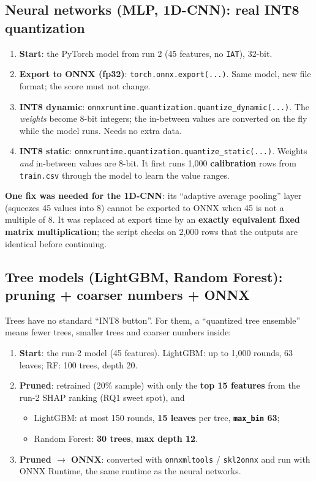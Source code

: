 \documentclass[11pt]{article}
\begin{document}
\subsection*{Neural networks (MLP, 1D-CNN): real INT8 quantization}
\begin{enumerate}
\item \textbf{Start}: the PyTorch model from run 2 (45 features, no \texttt{IAT}), 32-bit.
\item \textbf{Export to ONNX (fp32)}: \texttt{torch.onnx.export(...)}. Same model, new file format; the score must not change.
\item \textbf{INT8 dynamic}: \texttt{onnxruntime.quantization.quantize\_dynamic(...)}. The \emph{weights} become 8-bit integers; the in-between values
are converted on the fly while the model runs. Needs no extra data.
\item \textbf{INT8 static}: \texttt{onnxruntime.quantization.quantize\_static(...)}. Weights \emph{and} in-between values are 8-bit. It first
runs 1,000 \textbf{calibration} rows from \texttt{train.csv} through the model to learn the value ranges.
\end{enumerate}
\textbf{One fix was needed for the 1D-CNN}: its ``adaptive average pooling'' layer (squeezes 45 values into 8) cannot be exported to ONNX when 45 is
not a multiple of 8. It was replaced at export time by an \textbf{exactly equivalent fixed matrix multiplication}; the script checks on 2,000 rows that
the outputs are identical before continuing.

\subsection*{Tree models (LightGBM, Random Forest): pruning + coarser numbers + ONNX}
Trees have no standard ``INT8 button''. For them, a ``quantized tree ensemble'' means fewer trees, smaller trees and coarser numbers inside:
\begin{enumerate}
\item \textbf{Start}: the run-2 model (45 features). LightGBM: up to 1,000 rounds, 63 leaves; RF: 100 trees, depth 20.
\item \textbf{Pruned}: retrained (20\% sample) with only the \textbf{top 15 features} from the run-2 SHAP ranking (RQ1 sweet spot), and
\begin{itemize}
\item LightGBM: at most 150 rounds, \textbf{15 leaves} per tree, \textbf{\texttt{max\_bin} 63};
\item Random Forest: \textbf{30 trees}, \textbf{max depth 12}.
\end{itemize}
\item \textbf{Pruned $\rightarrow$ ONNX}: converted with \texttt{onnxmltools} / \texttt{skl2onnx} and run with ONNX Runtime, the same runtime as the neural networks.
\end{enumerate}
\end{document}

